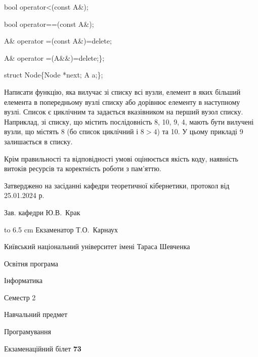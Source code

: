 \documentclass[12pt, ukrainian]{article}
\begin{document}
{\quad  bool operator<(const A\&); 

\quad  bool operator==(const A\&); 

\quad A\& operator =(const A\&)=delete; 

\quad  A\& operator =(A\&\&)=delete;\};

struct Node\{Node *next; A a;\};

 Написати функцію, яка вилучає зі списку всі вузли, елемент в яких більший елемента в попередньому вузлі списку або дорівнює елементу в наступному вузлі. Список є циклічним та задається вказівником на перший вузол списку. Наприклад, зі списку, що містить послідовність 8, 10, 9, 4, мають бути вилучені вузли, що містять 8 (бо список циклічний і $8>4$) та 10. У цьому прикладі 9 залишається в списку.

Крім правильності та відповідності умові оцінюється якість коду, наявність витоків ресурсів та коректність роботи з пам'яттю. 

}
{\smallskip\smallskip \begin {scriptsize} Затверджено на засіданні кафедри теоретичної кібернетики, протокол   від   25.01.2024 р.\par\smallskip\smallskip\smallskip\smallskip
{\parbox {6.5 cm} {Зав. кафедри \dotfill Ю.В.~Крак}}\hspace {0.7cm} {\hbox to 6.5 cm { Екзаменатор \dotfill Т.О.~Карнаух}} \end{scriptsize}}
\newpage
{{\begin {scriptsize}\par
{ \center  Київський національний університет імені Тараса Шевченка \par}
{\parbox {5 cm}{Освітня програма \hfill}{\parbox {7 cm}{Інформатика\hfill}}\parbox {6 cm}{\hfill Семестр 2}}\par
{\parbox {5 cm} {Навчальний предмет \hfill}\parbox {7 cm}{Програмування \hfill}\parbox {6cm}{\hfill}\par}\vspace{-15pt} \end{scriptsize}}{\center Екзаменаційний білет \No \textbf { 73 }\par}}
\end{document}
